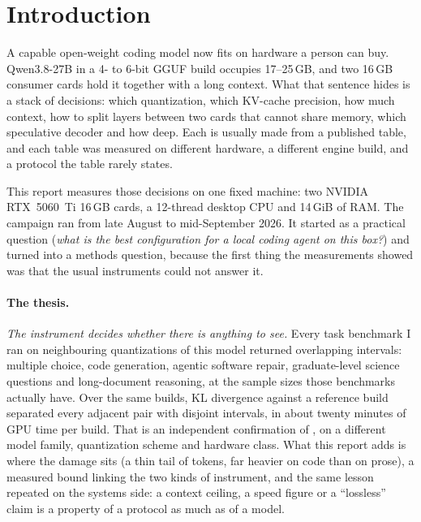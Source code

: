 \section{Introduction}\label{sec:intro}

A capable open-weight coding model now fits on hardware a person can buy. Qwen3.8-27B
\citep{qwen38,qwen38_27b_card} in a 4- to 6-bit GGUF build occupies 17--25\,GB, and two 16\,GB consumer
cards hold it together with a long context. What that sentence hides is a stack of decisions: which
quantization, which KV-cache precision, how much context, how to split layers between two cards that
cannot share memory, which speculative decoder and how deep. Each is usually made from a published
table, and each table was measured on different hardware, a different engine build, and a protocol
the table rarely states.

This report measures those decisions on one fixed machine: two NVIDIA RTX~5060~Ti 16\,GB cards, a
12-thread desktop CPU and 14\,GiB of RAM. The campaign ran from late August to mid-September 2026. It
started as a practical question (\emph{what is the best configuration for a local coding agent on this
box?}) and turned into a methods question, because the first thing the measurements showed was that
the usual instruments could not answer it.

\paragraph{The thesis.} \emph{The instrument decides whether there is anything to see.} Every task
benchmark I ran on neighbouring quantizations of this model returned overlapping intervals:
multiple choice, code generation, agentic software repair, graduate-level science questions and
long-document reasoning, at the sample sizes those benchmarks actually have. Over the same builds, KL
divergence against a reference build separated every adjacent pair with disjoint intervals, in about
twenty minutes of GPU time per build. That is an independent confirmation of
\citet{dutta2024accuracy}, on a different model family, quantization scheme and hardware class. What
this report adds is where the damage sits (a thin tail of tokens, far heavier on code than on prose),
a measured bound linking the two kinds of instrument, and the same lesson repeated on the systems
side: a context ceiling, a speed figure or a ``lossless'' claim is a property of a protocol as much as
of a model.

